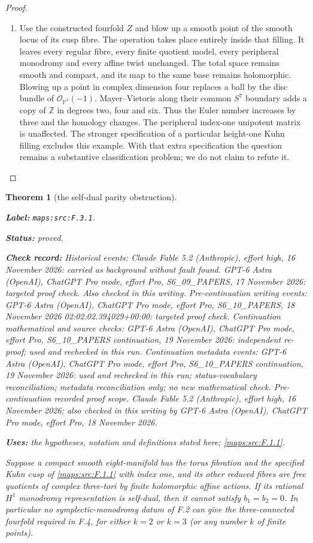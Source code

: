 \documentclass[11pt,a4paper]{article}
\newtheorem{theorem}{Theorem}[section]
\theoremstyle{definition}
\newcommand{\StatementRecord}[4]{\par\smallskip\begingroup\upshape\raggedright\noindent\textbf{Label:} \nolinkurl{#1}.\par\noindent\textbf{Status:} #2.\par\noindent\textbf{Check record:} #3.\par\noindent\textbf{Uses:} #4.\par\endgroup\smallskip}
\begin{document}
\begin{proof}
\begin{enumerate}[label=\arabic*.]
\item Use the constructed fourfold $Z$ and blow up a smooth point
of the smooth locus of its cusp fibre.  The operation takes
place entirely inside that filling.  It leaves every regular
fibre, every finite quotient model, every peripheral monodromy
and every affine twist unchanged.  The total space remains
smooth and compact, and its map to the same base remains
holomorphic.  Blowing up a point in complex dimension four
replaces a ball by the disc bundle of $\mathcal O_{\mathbb P^3}(-1)$.
Mayer--Vietoris along their common $S^7$ boundary adds a copy
of $\mathbb Z$ in degrees two, four and six.  Thus the Euler
number increases by three and the homology changes.  The
peripheral index-one unipotent matrix is unaffected.
The stronger specification of a particular height-one Kuhn
filling excludes this example.  With that extra specification
the question remains a substantive classification problem;
we do not claim to refute it.

\end{enumerate}
\end{proof}




\begin{theorem}[the self-dual parity obstruction]\label{maps:src:F.3.1}
\StatementRecord{maps:src:F.3.1}{proved}{Historical events: Claude Fable 5.2 (Anthropic), effort high, 16 November 2026: carried as background without fault found. GPT-6 Astra (OpenAI), ChatGPT Pro mode, effort Pro, S6\_09\_PAPERS, 17 November 2026: targeted proof check. Also checked in this writing. Pre-continuation writing events: GPT-6 Astra (OpenAI), ChatGPT Pro mode, effort Pro, S6\_10\_PAPERS, 18 November 2026 02:02:02.394029+00:00: targeted proof check. Continuation mathematical and source checks: GPT-6 Astra (OpenAI), ChatGPT Pro mode, effort Pro, S6\_10\_PAPERS continuation, 19 November 2026: independent re-proof; used and rechecked in this run. Continuation metadata events: GPT-6 Astra (OpenAI), ChatGPT Pro mode, effort Pro, S6\_10\_PAPERS continuation, 19 November 2026: used and rechecked in this run; status-vocabulary reconciliation; metadata reconciliation only; no new mathematical check. \emph{Pre-continuation recorded proof scope.} Claude Fable 5.2 (Anthropic), effort high, 16 November 2026; also checked in this writing by GPT-6 Astra (OpenAI), ChatGPT Pro mode, effort Pro, 18 November 2026}{the hypotheses, notation and definitions stated here; \cref{maps:src:F.1.1}}


Suppose a compact smooth eight-manifold has the torus fibration
and the specified Kuhn cusp of \ref{maps:src:F.1.1} with index one, and its
other reduced fibres are free quotients of complex three-tori
by finite holomorphic affine actions.  If its rational
$H^1$ monodromy representation is self-dual, then it cannot
satisfy $b_1=b_2=0$.  In particular no symplectic-monodromy
datum of F.2 can give the three-connected fourfold required
in F.4, for either $k=2$ or $k=3$ (or any number $k$ of finite
points).

\end{theorem}
\end{document}
